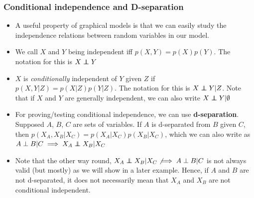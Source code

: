\subsubsection{Conditional independence and D-separation}
\begin{itemize}
	\item A useful property of graphical models is that we can easily study the independence relations between random variables in our model. 
	\item We call $X$ and $Y$ being independent iff $p(X,Y)=p(X)p(Y)$. The notation for this is $X\independent Y$
	\item $X$ is \textit{conditionally} independent of $Y$ given $Z$ if $p(X,Y|Z)=p(X|Z)p(Y|Z)$. The notation for this is $X\independent Y|Z$. Note that if $X$ and $Y$ are generally independent, we can also write $X\independent Y|\emptyset$
	\item For proving/testing conditional independence, we can use \textbf{d-separation}. Supposed $A$, $B$, $C$ are sets of variables. If $A$ is d-separated from $B$ given $C$, then $p(X_A,X_B|X_C)=p(X_A|X_C)p(X_B|X_C)$, which we can also write as $A\perp B|C\implies X_A\independent X_B|X_C$ 
	\item Note that the other way round, $X_A\independent X_B|X_C\not\implies A\perp B|C $ is not always valid (but mostly) as we will show in a later example. Hence, if $A$ and $B$ are not d-separated, it does not necessarily mean that $X_A$ and $X_B$ are not conditional independent.
	

\end{itemize}
